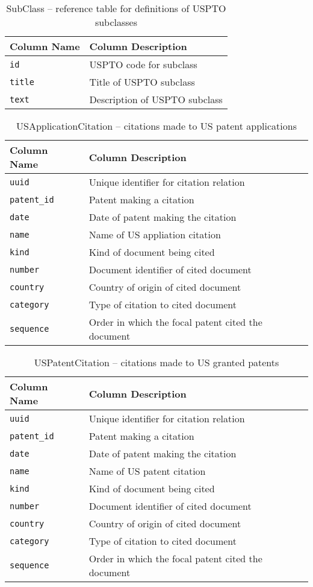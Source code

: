 \begin{table}[ht]
\center
\begin{tabular}{| l | l |}
\hline
Column Name & Column Description \\
\hline
\verb`id` & USPTO code for subclass \\
\verb`title` & Title of USPTO subclass \\
\verb`text` & Description of USPTO subclass \\
\hline
\end{tabular}
\caption{SubClass -- reference table for definitions of USPTO subclasses}
\end{table}

\begin{table}[ht]
\center
\begin{tabular}{| l | l |}
\hline
Column Name & Column Description \\
\hline
\verb`uuid` & Unique identifier for citation relation \\
\verb`patent_id` & Patent making a citation \\
\verb`date` & Date of patent making the citation \\
\verb`name` & Name of US appliation citation \\
\verb`kind` & Kind of document being cited \\
\verb`number` & Document identifier of cited document \\
\verb`country` & Country of origin of cited document \\
\verb`category` & Type of citation to cited document \\
\verb`sequence` & Order in which the focal patent cited the document \\
\hline
\end{tabular}
\caption{USApplicationCitation -- citations made to US patent applications}
\end{table}

\begin{table}[ht]
\center
\begin{tabular}{| l | l |}
\hline
Column Name & Column Description \\
\hline
\verb`uuid` & Unique identifier for citation relation \\
\verb`patent_id` & Patent making a citation \\
\verb`date` & Date of patent making the citation \\
\verb`name` & Name of US patent citation \\
\verb`kind` & Kind of document being cited \\
\verb`number` & Document identifier of cited document \\
\verb`country` & Country of origin of cited document \\
\verb`category` & Type of citation to cited document \\
\verb`sequence` & Order in which the focal patent cited the document \\
\hline
\end{tabular}
\caption{USPatentCitation -- citations made to US granted patents}
\end{table}

